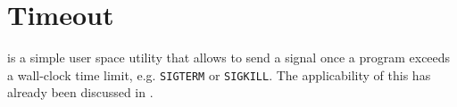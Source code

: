 
\section{Timeout}

\cite{man-1-timeout} is a simple user space utility that allows to send a
signal once a program exceeds a wall-clock time limit, e.g. \texttt{SIGTERM} or
\texttt{SIGKILL}. The applicability of this has already been discussed in
.
